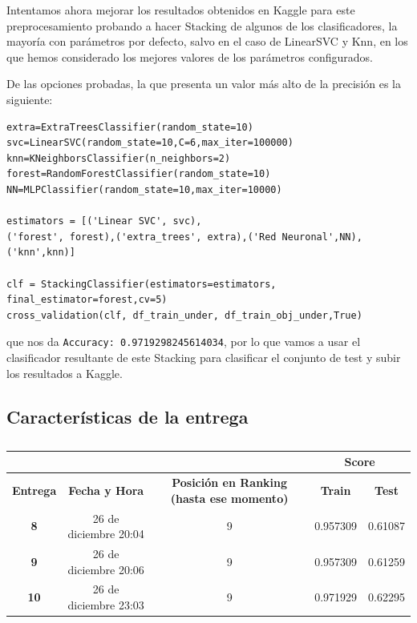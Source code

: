 \documentclass[a4paper,11pt]{article}
\begin{document}
Intentamos ahora mejorar los resultados obtenidos en Kaggle para este preprocesamiento probando a hacer Stacking de algunos de los clasificadores, la mayoría con parámetros por defecto, salvo en el caso de LinearSVC y Knn, en los que hemos considerado los mejores valores de los parámetros configurados. 

De las opciones probadas, la que presenta un valor más alto de la precisión es la siguiente:
\begin{verbatim}
extra=ExtraTreesClassifier(random_state=10)
svc=LinearSVC(random_state=10,C=6,max_iter=100000)
knn=KNeighborsClassifier(n_neighbors=2)
forest=RandomForestClassifier(random_state=10)
NN=MLPClassifier(random_state=10,max_iter=10000)

estimators = [('Linear SVC', svc),
('forest', forest),('extra_trees', extra),('Red Neuronal',NN),('knn',knn)]

clf = StackingClassifier(estimators=estimators, final_estimator=forest,cv=5)
cross_validation(clf, df_train_under, df_train_obj_under,True)
\end{verbatim}

que nos da \texttt{Accuracy:  0.9719298245614034}, por lo que vamos a usar el clasificador resultante de este Stacking para clasificar el conjunto de test y subir los resultados a Kaggle.

\subsection{Características de la entrega}

\begin{table}[htbp]
	\caption{}\begin{center}
	\begin{tabular}{|c|c|c|c|c|}
		\hline
		\multicolumn{1}{|l|}{\textbf{}} & \textbf{} & \textbf{} & \multicolumn{ 2}{c|}{\textbf{Score}} \\ \hline
		\textbf{Entrega} & \textbf{Fecha y Hora} & \textbf{Posición en Ranking (hasta ese momento)} & \textbf{Train} & \textbf{Test} \\ \hline
		\textbf{8} & 26 de diciembre 20:04 & 9 & 0.957309 & 0.61087 \\ \hline
		\textbf{9} & 26 de diciembre 20:06 & 9 & 0.957309 & 0.61259 \\ \hline
		\textbf{10} & 26 de diciembre 23:03 & 9 & 0.971929 & 0.62295 \\ \hline
	\end{tabular}\end{center}
	\label{}
\end{table}
\end{document}
